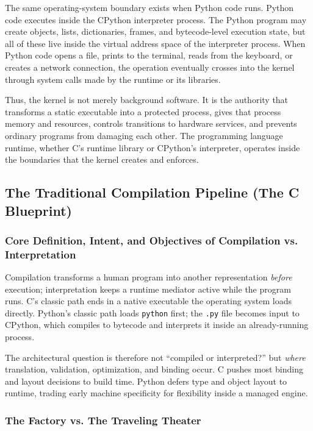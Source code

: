 \documentclass[a4paper,twoside]{report}
\begin{document}
The same operating-system boundary exists when Python code runs. Python code executes inside the CPython interpreter process. The Python program may create objects, lists, dictionaries, frames, and bytecode-level execution state, but all of these live inside the virtual address space of the interpreter process. When Python code opens a file, prints to the terminal, reads from the keyboard, or creates a network connection, the operation eventually crosses into the kernel through system calls made by the runtime or its libraries.

Thus, the kernel is not merely background software. It is the authority that transforms a static executable into a protected process, gives that process memory and resources, controls transitions to hardware services, and prevents ordinary programs from damaging each other. The programming language runtime, whether C's runtime library or CPython's interpreter, operates inside the boundaries that the kernel creates and enforces.

\subsection{The Traditional Compilation Pipeline (The C Blueprint)}

\subsubsection{Core Definition, Intent, and Objectives of Compilation vs. Interpretation}

Compilation transforms a human program into another representation \emph{before} execution; interpretation keeps a runtime mediator active while the program runs. C's classic path ends in a native executable the operating system loads directly. Python's classic path loads \texttt{python} first; the \texttt{.py} file becomes input to CPython, which compiles to bytecode and interprets it inside an already-running process.

The architectural question is therefore not ``compiled or interpreted?'' but \emph{where} translation, validation, optimization, and binding occur. C pushes most binding and layout decisions to build time. Python defers type and object layout to runtime, trading early machine specificity for flexibility inside a managed engine.

\subsubsection{The Factory vs. The Traveling Theater}
\end{document}
